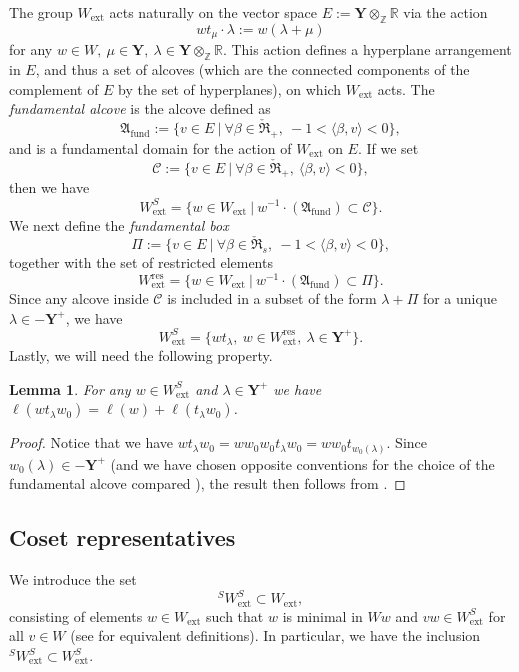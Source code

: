 \documentclass[11pt]{amsart}
\theoremstyle{plain}
\newtheorem{lem}[thm]{Lemma}
\theoremstyle{remark}
\numberwithin{equation}{section}
\begin{document}
	The group $W_{\mathrm{ext}}$ acts naturally on the vector space $E:=\mathbf{Y}\otimes_\mathbb{Z} \mathbb{R}$ via the  action 
	$$wt_\mu\cdot \lambda:=w(\lambda+\mu)$$ for any $w\in W,~\mu\in\mathbf{Y},~\lambda\in \mathbf{Y}\otimes_\mathbb{Z} \mathbb{R}$. This action defines a hyperplane arrangement in $E$, and thus a set of alcoves (which are the connected components of the complement of $E$ by the set of hyperplanes), on which $W_\mathrm{ext}$ acts. The \textit{fundamental alcove} is the alcove defined as
	$$\mathfrak{A}_{\mathrm{fund}}:=\{v\in E~|~\forall\beta\in \check{\mathfrak{R}}_+,~-1<\langle \beta,v\rangle<0\},$$
	and is a fundamental domain for the action of $W_\mathrm{ext}$ on $E$. If we set
	$$\mathcal{C}:=\{v\in E~|~\forall\beta\in \check{\mathfrak{R}}_+,~\langle \beta,v\rangle<0\}, $$
	then we have
	\begin{equation}\label{equ dominant}
		W^S_\mathrm{ext}=\{w\in W_\mathrm{ext}~|~w^{-1}\cdot(\mathfrak{A}_{\mathrm{fund}})\subset\mathcal{C}\}. 
	\end{equation}
	We next define the \textit{fundamental box} 
	$$\Pi:=\{v\in E~|~\forall\beta\in \check{\mathfrak{R}}_s,~-1<\langle \beta,v\rangle<0\},$$
	together with the set of restricted elements
	$$W^\mathrm{res}_\mathrm{ext}=\{w\in W_\mathrm{ext}~|~w^{-1}\cdot(\mathfrak{A}_{\mathrm{fund}})\subset\Pi\}.$$
	Since any alcove inside $\mathcal{C}$ is included in a subset of the form $\lambda+\Pi$ for a unique $\lambda\in -\mathbf{Y}^+$, we have
	$$W^S_\mathrm{ext}=\{wt_\lambda,~w\in W^\mathrm{res}_\mathrm{ext},~\lambda\in\mathbf{Y}^+ \}. $$
	Lastly, we will need the following property.
	\begin{lem}\label{lem length}
		For any $w\in W^S_\mathrm{ext}$ and $\lambda\in\mathbf{Y}^+$ we have $\ell(wt_\lambda w_0)=\ell(w)+\ell(t_\lambda w_0)$.
	\end{lem}
 \begin{proof}
     Notice that we have $wt_\lambda w_0=ww_0w_0t_\lambda w_0=ww_0t_{w_0(\lambda)}$. Since $w_0(\lambda)\in-\mathbf{Y}^+$ (and we have chosen opposite conventions for the choice of the fundamental alcove compared \cite{achar2022geometric}), the result then follows from \cite[Lemma 2.7]{achar2022geometric}.
 \end{proof}
	\subsection{Coset representatives} We introduce the set 
 $$^SW_\mathrm{ext}^S\subset W_\mathrm{ext},$$  
 consisting of elements $w\in W_\mathrm{ext}$ such that $w$ is minimal in $Ww$ and $vw\in W^S_\mathrm{ext}$ for all $v\in W$ (see \cite[Lemma 2.4]{achar2021geometric} for equivalent definitions). In particular, we have the inclusion $^SW_\mathrm{ext}^S\subset W_\mathrm{ext}^S$.
\end{document}
